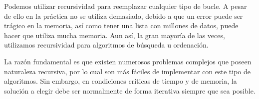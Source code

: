 Podemos utilizar recursividad para reemplazar cualquier tipo de bucle. A pesar de ello en la práctica no se utiliza demasiado, debido a que un error puede ser trágico en la memoria, así como tener una lista con millones de datos, puede hacer que utiliza mucha memoria. Aun así, la gran mayoría de las veces, utilizamos recursividad para algoritmos de búsqueda u ordenación.

La razón fundamental es que existen numerosos
problemas complejos que poseen naturaleza
recursiva, por lo cual son más fáciles de
implementar con este tipo de algoritmos. Sin embargo, en condiciones críticas de tiempo y
de memoria, la solución a elegir debe ser
normalmente de forma iterativa siempre que sea posible.